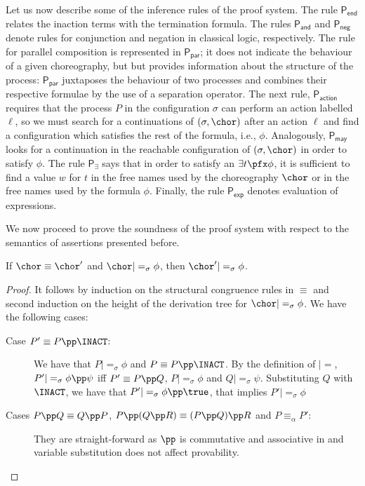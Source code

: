 Let us now describe some of the inference rules of the proof system.
The rule $\mathsf{P_{end}}$ relates the inaction terms with the
termination formula. The rules $\mathsf{P_{and}}$ and
$\mathsf{P_{neg}}$ denote rules for conjunction and negation in
classical logic, respectively. The rule for parallel composition is
represented in $\mathsf{P_{par}}$; it does not indicate the behaviour
of a given choreography, but but provides information about the
structure of the process: $\mathsf{P_{par}}$ juxtaposes the behaviour
of two processes and combines their respective formulae by the use of
a separation operator. The next rule, $\mathsf{P_{action}}$ requires
that the process $P$ in the configuration $\sigma$ can perform an
action labelled $\ell$, so we must search for a continuations of
$(\sigma,\chor)$ after an action $\ell$ and find a configuration which
satisfies the rest of the formula, i.e., $\phi$.  Analogously,
$\mathsf{P_{may}}$ looks for a continuation in the reachable
configuration of $(\sigma,\chor)$ in order to satisfy $\phi$.  The rule
$\mathsf{P_\exists}$ says that in order to satisfy an $\exists t\pfx
\phi$, it is sufficient to find a value $w$ for $t$ in the free names
used by the choreography $\chor$ or in the free names used by the
formula $\phi$. Finally, the rule $\mathsf{P_{exp}}$ denotes
evaluation of expressions.

We now proceed to prove the soundness of the proof system with respect
to the semantics of assertions presented before.

\begin{lemma}
  \label{Logic4Struct:lemma:StructuralSatisfiability} If $\chor\equiv\chor'$ and
  $\chor|=_\sigma \phi$, then $\chor' |=_\sigma \phi$.
\end{lemma}
\begin{proof}
    It follows by induction on the structural congruence rules in
    $\equiv$ and second induction on the height of the derivation tree
    for   $\chor|=_\sigma \phi$.
    We have the following cases:
   \begin{description}
   	\item[Case $P' \equiv P \pp \INACT$:]
		We have that  $P |=_\sigma \phi$ and $P \equiv P \pp \INACT $. By the definition of $|=$, 
		$P' |=_\sigma \phi \pp \psi$ iff $P' \equiv P \pp Q$, $P |=_\sigma \phi$ and $Q |=_\sigma \psi$. 
		Substituting $Q$ with $\INACT$, we have that $P' |=_\sigma \phi \pp \true$, that implies $P' |=_\sigma \phi$
	\item[Cases $P \pp Q \equiv Q \pp P$, $P \pp (Q \pp R) \equiv
          (P \pp Q) \pp R$ and $P \equiv_\alpha P'$:] They are
          straight-forward  as $\pp$ is commutative and associative in \GL and variable substitution does not affect provability.
   \end{description}
\end{proof}



